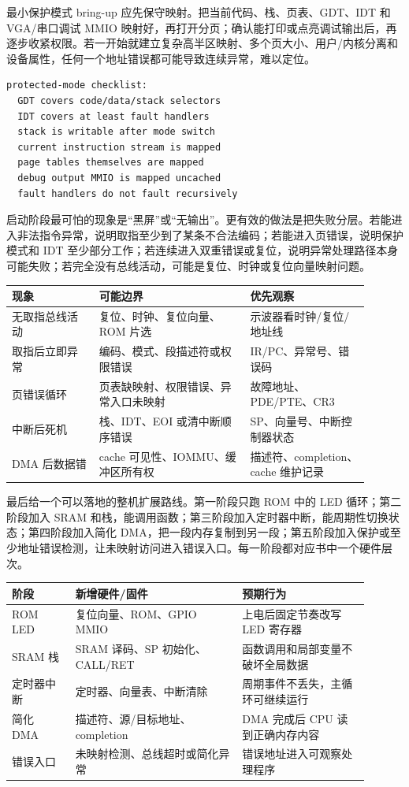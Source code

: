 最小保护模式 bring-up 应先保守映射。把当前代码、栈、页表、GDT、IDT 和 VGA/串口调试 MMIO 映射好，再打开分页；确认能打印或点亮调试输出后，再逐步收紧权限。若一开始就建立复杂高半区映射、多个页大小、用户/内核分离和设备属性，任何一个地址错误都可能导致连续异常，难以定位。

\begin{lstlisting}
protected-mode checklist:
  GDT covers code/data/stack selectors
  IDT covers at least fault handlers
  stack is writable after mode switch
  current instruction stream is mapped
  page tables themselves are mapped
  debug output MMIO is mapped uncached
  fault handlers do not fault recursively
\end{lstlisting}

启动阶段最可怕的现象是“黑屏”或“无输出”。更有效的做法是把失败分层。若能进入非法指令异常，说明取指至少到了某条不合法编码；若能进入页错误，说明保护模式和 IDT 至少部分工作；若连续进入双重错误或复位，说明异常处理路径本身可能失败；若完全没有总线活动，可能是复位、时钟或复位向量映射问题。

\begin{longtable}{L{0.22\linewidth}L{0.38\linewidth}L{0.3\linewidth}}
\toprule
现象 & 可能边界 & 优先观察 \\
\midrule
无取指总线活动 & 复位、时钟、复位向量、ROM 片选 & 示波器看时钟/复位/地址线 \\
取指后立即异常 & 编码、模式、段描述符或权限错误 & IR/PC、异常号、错误码 \\
页错误循环 & 页表缺映射、权限错误、异常入口未映射 & 故障地址、PDE/PTE、CR3 \\
中断后死机 & 栈、IDT、EOI 或清中断顺序错误 & SP、向量号、中断控制器状态 \\
DMA 后数据错 & cache 可见性、IOMMU、缓冲区所有权 & 描述符、completion、cache 维护记录 \\
\bottomrule
\end{longtable}

最后给一个可以落地的整机扩展路线。第一阶段只跑 ROM 中的 LED 循环；第二阶段加入 SRAM 和栈，能调用函数；第三阶段加入定时器中断，能周期性切换状态；第四阶段加入简化 DMA，把一段内存复制到另一段；第五阶段加入保护或至少地址错误检测，让未映射访问进入错误入口。每一阶段都对应书中一个硬件层次。

\begin{longtable}{L{0.16\linewidth}L{0.42\linewidth}L{0.32\linewidth}}
\toprule
阶段 & 新增硬件/固件 & 预期行为 \\
\midrule
ROM LED & 复位向量、ROM、GPIO MMIO & 上电后固定节奏改写 LED 寄存器 \\
SRAM 栈 & SRAM 译码、SP 初始化、CALL/RET & 函数调用和局部变量不破坏全局数据 \\
定时器中断 & 定时器、向量表、中断清除 & 周期事件不丢失，主循环可继续运行 \\
简化 DMA & 描述符、源/目标地址、completion & DMA 完成后 CPU 读到正确内存内容 \\
错误入口 & 未映射检测、总线超时或简化异常 & 错误地址进入可观察处理程序 \\
\bottomrule
\end{longtable}

